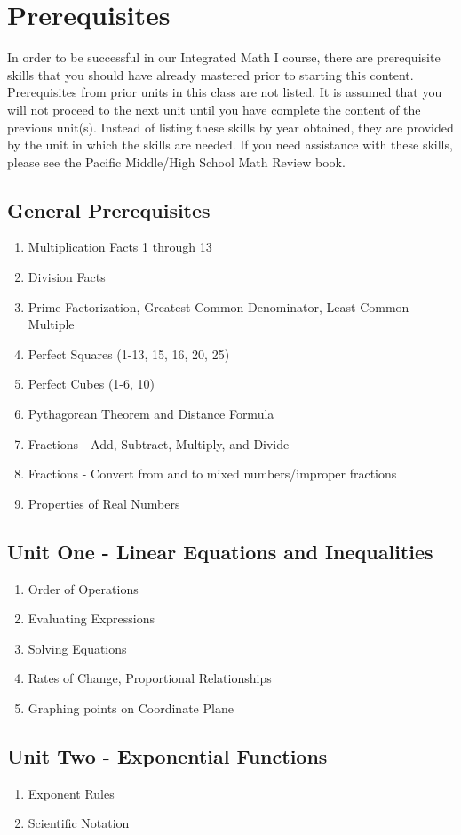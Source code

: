 \section{Prerequisites}
In order to be successful in our Integrated Math I course, there are prerequisite skills that you should have already mastered prior to starting this content. Prerequisites from prior units in this class are not listed. It is assumed that you will not proceed to the next unit until you have complete the content of the previous unit(s). Instead of listing these skills by year obtained, they are provided by the unit in which the skills are needed. If you need assistance with these skills, please see the Pacific Middle/High School Math Review book.
\subsection{General Prerequisites}
\begin{enumerate}
    \item Multiplication Facts 1 through 13
    \item Division Facts
    \item Prime Factorization, Greatest Common Denominator, Least Common Multiple
    \item Perfect Squares (1-13, 15, 16, 20, 25)
    \item Perfect Cubes (1-6, 10)
    \item Pythagorean Theorem and Distance Formula
    \item Fractions - Add, Subtract, Multiply, and Divide
    \item Fractions - Convert from and to mixed numbers/improper fractions
    \item Properties of Real Numbers
\end{enumerate}
\subsection{Unit One - Linear Equations and Inequalities}
\begin{enumerate}
    \item Order of Operations
    \item Evaluating Expressions
    \item Solving Equations
    \item Rates of Change, Proportional Relationships
    \item Graphing points on Coordinate Plane
\end{enumerate}
\subsection{Unit Two - Exponential Functions}
\begin{enumerate}
    \item Exponent Rules
    \item Scientific Notation
\end{enumerate}
